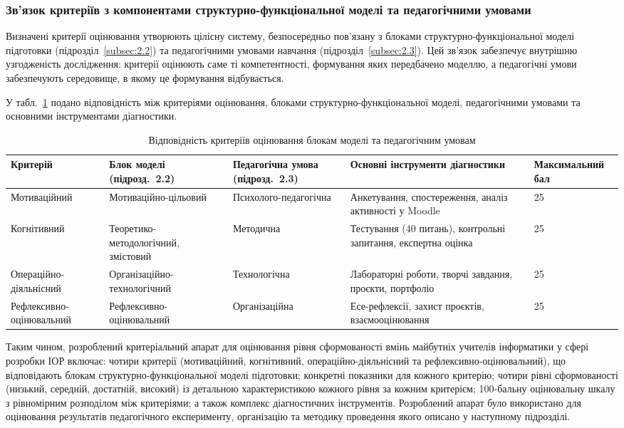 \subsubsection{Зв'язок критеріїв з компонентами структурно-функціональної моделі та педагогічними умовами}

Визначені критерії оцінювання утворюють цілісну систему, безпосередньо пов'язану з блоками структурно-функціональної моделі підготовки (підрозділ~\ref{subsec:2.2}) та педагогічними умовами навчання (підрозділ~\ref{subsec:2.3}). Цей зв'язок забезпечує внутрішню узгодженість дослідження: критерії оцінюють саме ті компетентності, формування яких передбачено моделлю, а педагогічні умови забезпечують середовище, в якому це формування відбувається.

У табл.~\ref{tab:criteria_model_link} подано відповідність між критеріями оцінювання, блоками структурно-функціональної моделі, педагогічними умовами та основними інструментами діагностики.

\begin{table}[htbp]
\centering
\caption{Відповідність критеріїв оцінювання блокам моделі та педагогічним умовам}
\label{tab:criteria_model_link}
\small
\begin{tabular}{|p{2.3cm}|p{3cm}|p{3cm}|p{2.5cm}|p{2.5cm}|}
\hline
\textbf{Критерій} & \textbf{Блок моделі (підрозд.~2.2)} & \textbf{Педагогічна умова (підрозд.~2.3)} & \textbf{Основні інстру\-менти діаг\-ностики} & \textbf{Максимальний бал} \\
\hline
Мотива\-ційний & Мотиваційно-цільовий & Психолого-педагогічна & Анкетування, спостереження, аналіз активності у Moodle & 25 \\
\hline
Когнітив\-ний & Теоретико-методо\-логічний, змістовий & Методична & Тестування (40 питань), контрольні запитання, експертна оцінка & 25 \\
\hline
Операційно-діяль\-нісний & Організаційно-техно\-логічний & Технологічна & Лабораторні роботи, творчі завдання, проєкти, портфоліо & 25 \\
\hline
Рефлексивно-оціню\-вальний & Рефлексивно-оціню\-вальний & Організаційна & Есе-рефлексії, захист проєктів, взаємо\-оцінювання & 25 \\
\hline
\end{tabular}
\end{table}

Таким чином, розроблений критеріальний апарат для оцінювання рівня сформованості вмінь майбутніх учителів інформатики у сфері розробки ІОР включає: чотири критерії (мотиваційний, когнітивний, операційно-діяльнісний та рефлексивно-оцінювальний), що відповідають блокам структурно-функціональної моделі підготовки; конкретні показники для кожного критерію; чотири рівні сформованості (низький, середній, достатній, високий) із детальною характеристикою кожного рівня за кожним критерієм; 100-бальну оцінювальну шкалу з рівномірним розподілом між критеріями; а також комплекс діагностичних інструментів. Розроблений апарат було використано для оцінювання результатів педагогічного експерименту, організацію та методику проведення якого описано у наступному підрозділі.
